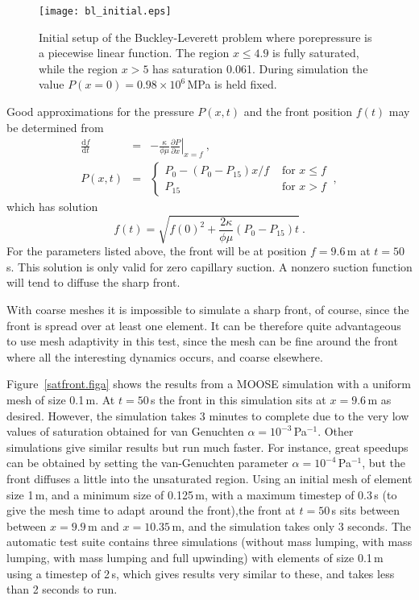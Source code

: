 \documentclass[]{scrreprt}
\begin{document}
\begin{figure}[htb]
\begin{center}
\texttt{[image: bl\_initial.eps]}
\caption{Initial setup of the Buckley-Leverett problem where
  porepressure is a piecewise linear function.  The region
$x\leq 4.9$ is fully saturated, while the region $x>5$ has saturation
  0.061.  During simulation the value $P(x=0)=0.98\times 10^{6}$\,MPa
  is held fixed.}
\label{bl_setup.figa}
\end{center}
\end{figure}

Good approximations for the pressure $P(x,t)$
and the front position $f(t)$ may be determined from
\begin{eqnarray}
\frac{{\mathrm d} f}{{\mathrm d} t} & = & -\frac{\kappa}{\phi\mu}
\left.\frac{\partial  P}{\partial x}\right|_{x = f} \ , \nonumber \\
P(x,t) & = & \left\{
\begin{array}{ll}
P_{0} - (P_{0}-P_{15})x/f & \mbox{ for } x\leq f  \\
P_{15} & \mbox{ for } x>f 
\end{array}
\right. \ ,
\label{eqn.predicted.bl.posn.eqna}
\end{eqnarray}
which has solution
\begin{equation}
f(t) = \sqrt{f(0)^{2} + \frac{2\kappa}{\phi\mu}(P_{0}-P_{15})t} \ .
\end{equation}
For the parameters listed above, the front will be at position
$f=9.6$\,m at $t=50$\,s.  This solution is only valid for zero
capillary suction.  A nonzero suction function will tend to diffuse
the sharp front.

With coarse meshes it is impossible to simulate a sharp front, of
course, since the front is spread over at least one element.  It can be
therefore quite advantageous to use mesh adaptivity in this test,
since the mesh can be fine around the front where all the interesting
dynamics occurs, and coarse elsewhere.

Figure~\ref{satfront.figa} shows the results from a MOOSE simulation
with a uniform mesh of size 0.1\,m.  At $t=50$\,s the front in this
simulation sits at $x=9.6$\,m as desired.  However, the simulation
takes 3 minutes to complete due to the very low values of saturation
obtained for van Genuchten $\alpha=10^{-3}$\,Pa$^{-1}$.  Other
simulations give similar results but run much faster.  For instance,
great speedups can be obtained by setting the van-Genuchten parameter
$\alpha=10^{-4}$\,Pa$^{-1}$, but the front diffuses a little into the
unsaturated region.  Using an initial mesh of element size 1\,m, and a
minimum size of 0.125\,m, with a maximum timestep of 0.3\,s (to give
the mesh time to adapt around the front),the front at $t=50$\,s sits
between between $x=9.9$\,m and $x=10.35$\,m, and the simulation takes
only 3 seconds.  The automatic test suite contains three simulations
(without mass lumping, with mass lumping, with mass lumping and full
upwinding) with elements of size 0.1\,m using a timestep of 2\,s,
which gives results very similar to these, and takes less than 2
seconds to run.
\end{document}
